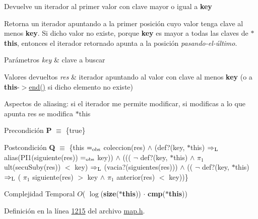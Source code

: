 Devuelve un iterador al primer valor con clave mayor o igual a {\bfseries key} 

Retorna un iterador apuntando a la primer posición cuyo valor tenga clave al menos {\bfseries key}. Si dicho valor no existe, porque {\bfseries key} es mayor a todas las claves de {\bfseries $\ast$this}, entonces el iterador retornado apunta a la posición {\itshape pasando-\/el-\/último}.


\begin{DoxyParams}{Parámetros}
{\em key} & clave a buscar \\
\hline
\end{DoxyParams}

\begin{DoxyRetVals}{Valores devueltos}
{\em res} & iterador apuntando al valor con clave al menos {\bfseries key} (o a {\bfseries this}-\/$>$\hyperlink{classaed2_1_1map_a76023e6a56cb625513e1b5ea028bf983_a76023e6a56cb625513e1b5ea028bf983}{end()} si dicho elemento no existe)\\
\hline
\end{DoxyRetVals}
\begin{DoxyParagraph}{Aspectos de aliasing\+:}
si el iterador me permite modificar, si modificas a lo que apunta res se modifica $\ast$this
\end{DoxyParagraph}
\begin{DoxyPrecond}{Precondición}
{\bfseries P} $\equiv$ \{true\} 
\end{DoxyPrecond}
\begin{DoxyPostcond}{Postcondición}
{\bfseries Q} $\equiv$ \{this $=_{\rm obs}$ coleccion(res) $\land$ (def?(key, $\ast$this) $\Rightarrow_{\rm L}$ alias(P\+I1(siguiente(res)) $=_{\rm obs}$ key)) $\land$ ((( $\lnot$ def?(key, $\ast$this) $\land$ $\pi_1$ ult(secu\+Suby(res)) $<$ key) $\Rightarrow_{\rm L}$ (vacia?(siguientes(res))) $\land$ (( $\lnot$ def?(key, $\ast$this) $\Rightarrow_{\rm L}$ ( $\pi_1$ siguiente(res) $>$ key $\land$ $\pi_1$ anterior(res) $<$ key))\}
\end{DoxyPostcond}

\begin{DoxyDescription}
\item[Complejidad Temporal]$O$( $\log$({\bfseries size}({\bfseries $\ast$this})) $\cdot$ {\bfseries cmp}({\bfseries $\ast$this}))
\end{DoxyDescription}

Definición en la línea \hyperlink{map_8h_source_l01215}{1215} del archivo \hyperlink{map_8h_source}{map.\+h}.

